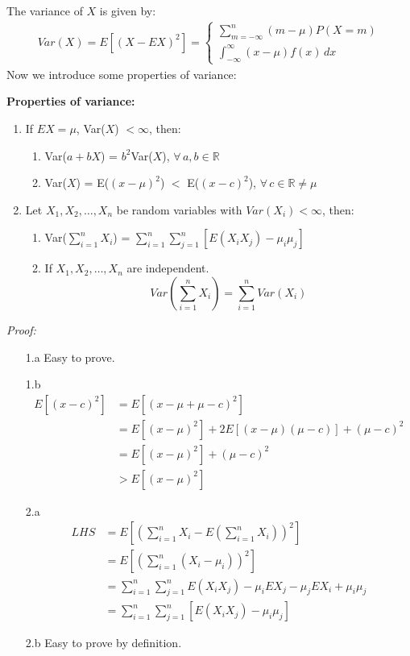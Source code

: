\documentclass{article}
\begin{document}
The variance of $X$ is given by:
\begin{align*}
    Var(X) = E[(X - EX)^2] = \begin{cases}
        \sum^n_{m = -\infty}(m - \mu)P(X = m) \\
        \int^\infty_{-\infty}(x-\mu)f(x)\,dx
    \end{cases}
\end{align*}
Now we introduce some properties of variance:
\begin{theorem}
    \textbf{Properties of variance:}
    \begin{enumerate}
        \item If $EX = \mu$, Var($X$) $< \infty$, then:
        \begin{enumerate}
            \item Var($a+bX$) = $b^2$Var($X$), $\forall\, a,b \in \mathbb{R}$
            \item Var($X$) = E($(x - \mu)^2$) $<$ E($(x-c)^2$), $\forall \,c \in \mathbb{R} \neq \mu$
        \end{enumerate}
        \item Let $X_1,X_2,\dots,X_n$ be random variables with $Var(X_i) < \infty$, then:
        \begin{enumerate}
            \item Var($\sum^n_{i=1}X_i$) = $\sum^n_{i=1}\sum^n_{j=1}[E(X_iX_j) - \mu_i\mu_j]$
            \item If $X_1,X_2,\dots,X_n$ are independent.
            \begin{equation*}
                Var(\sum^n_{i=1}X_i) = \sum^n_{i=1}Var(X_i)
            \end{equation*}
        \end{enumerate}
    \end{enumerate}
\end{theorem}

\emph{Proof:}
\begin{enumerate}
    \item[1.a] Easy to prove.
    \item[1.b] 
    \begin{align*}
        E[(x-c)^2]  &= E[(x - \mu + \mu -c)^2] \\
                    &= E[(x - \mu)^2] + 2E[(x - \mu)(\mu - c)] + (\mu - c)^2 \\
                    &= E[(x - \mu)^2] + (\mu - c)^2 \\
                    &> E[(x - \mu)^2]
    \end{align*}    
    \item[2.a]
    \begin{align*}
        LHS &= E[(\sum^n_{i=1}X_i - E(\sum^n_{i=1}X_i))^2] \\
            &= E[(\sum^n_{i=1}(X_i - \mu_i))^2] \\
            &= \sum^n_{i=1}\sum^n_{j=1} E(X_iX_j) - \mu_iEX_j - \mu_jEX_i + \mu_i\mu_j \\
            &= \sum^n_{i=1}\sum^n_{j=1}[E(X_iX_j) - \mu_i\mu_j]
    \end{align*}
    \item[2.b] Easy to prove by definition.
\end{enumerate}
\end{document}

